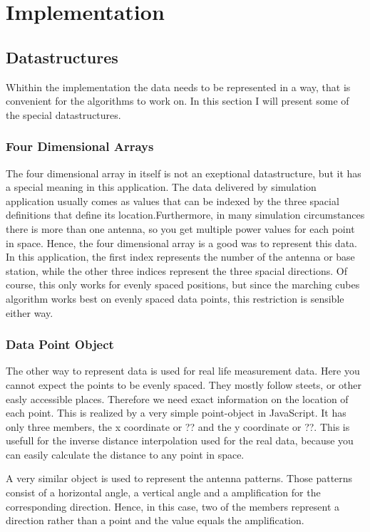 \chapter{Implementation}
\section{Datastructures}
Whithin the implementation the data needs to be represented in a way, that is convenient for the algorithms to work on. In this section I will present some of the special datastructures.
\subsection{Four Dimensional Arrays}
The four dimensional array in itself is not an exeptional datastructure, but it has a special meaning in this application. The data delivered by simulation application usually comes as values that can be indexed by the three spacial definitions that define its location.Furthermore, in many simulation circumstances there is more than one antenna, so you get multiple power values for each point in space. Hence, the four dimensional array is a good was to represent this data. In this application, the first index represents the number of the antenna or base station, while the other three indices represent the three spacial directions. Of course, this only works for evenly spaced  positions, but since the marching cubes algorithm works best on evenly spaced data points, this restriction is sensible either way.
\subsection{Data Point Object}
The other way to represent data is used for real life measurement data. Here you cannot expect the points to be evenly spaced. They mostly follow steets, or other easly accessible places. Therefore we need exact information on the location of each point. This is realized by a very simple point-object in JavaScript. It has only three members, the x coordinate or ?? and the y coordinate or ??. This is usefull for the inverse distance interpolation used for the real data, because you can easily calculate the distance to any point in space.

A very similar object is used to represent the antenna patterns. Those patterns consist of a horizontal angle, a vertical angle and a amplification for the corresponding direction. Hence, in this case, two of the members represent a direction rather than a point and the value equals the amplification.

